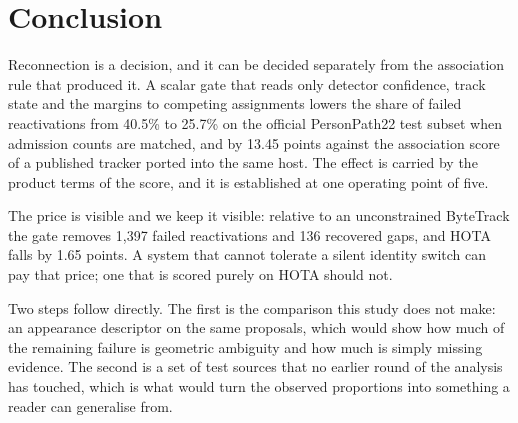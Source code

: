 \section{Conclusion}

Reconnection is a decision, and it can be decided separately from the
association rule that produced it. A scalar gate that reads only detector
confidence, track state and the margins to competing assignments lowers the
share of failed reactivations from 40.5\% to 25.7\% on the official
PersonPath22 test subset when admission counts are matched, and by 13.45
points against the association score of a published tracker ported into the
same host. The effect is carried by the product terms of the score, and it
is established at one operating point of five.

The price is visible and we keep it visible: relative to an unconstrained
ByteTrack the gate removes 1,397 failed reactivations and 136 recovered
gaps, and HOTA falls by 1.65 points. A system that cannot tolerate a silent
identity switch can pay that price; one that is scored purely on HOTA
should not.

Two steps follow directly. The first is the comparison this study does not
make: an appearance descriptor on the same proposals, which would show how
much of the remaining failure is geometric ambiguity and how much is simply
missing evidence. The second is a set of test sources that no earlier round
of the analysis has touched, which is what would turn the observed
proportions into something a reader can generalise from.
